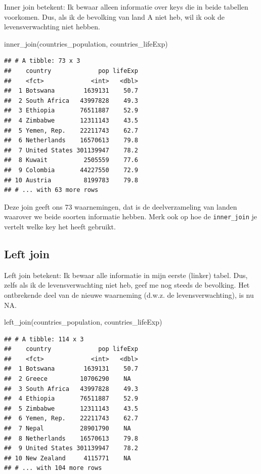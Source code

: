 \documentclass[]{tufte-book}
\newenvironment{Shaded}{}{}
\newcommand{\FunctionTok}[1]{\textcolor[rgb]{0.02,0.16,0.49}{#1}}
\newcommand{\NormalTok}[1]{#1}
\begin{document}
Inner join betekent: Ik bewaar alleen informatie over keys die in beide tabellen voorkomen. Dus, als ik de bevolking van land A niet heb, wil ik ook de levensverwachting niet hebben.

\begin{Shaded}
\begin{Highlighting}[]
\FunctionTok{inner\_join}\NormalTok{(countries\_population, countries\_lifeExp)}
\end{Highlighting}
\end{Shaded}

\begin{verbatim}
## # A tibble: 73 x 3
##    country             pop lifeExp
##    <fct>             <int>   <dbl>
##  1 Botswana        1639131    50.7
##  2 South Africa   43997828    49.3
##  3 Ethiopia       76511887    52.9
##  4 Zimbabwe       12311143    43.5
##  5 Yemen, Rep.    22211743    62.7
##  6 Netherlands    16570613    79.8
##  7 United States 301139947    78.2
##  8 Kuwait          2505559    77.6
##  9 Colombia       44227550    72.9
## 10 Austria         8199783    79.8
## # ... with 63 more rows
\end{verbatim}

Deze join geeft ons 73 waarnemingen, dat is de deelverzameling van landen waarover we beide soorten informatie hebben. Merk ook op hoe de \texttt{inner\_join} je vertelt welke key het heeft gebruikt.

\hypertarget{left-join}{%
\subsection{Left join}\label{left-join}}

Left join betekent: Ik bewaar alle informatie in mijn eerste (linker) tabel. Dus, zelfs als ik de levensverwachting niet heb, geef me nog steeds de bevolking. Het ontbrekende deel van de nieuwe waarneming (d.w.z. de levensverwachting), is nu NA.

\begin{Shaded}
\begin{Highlighting}[]
\FunctionTok{left\_join}\NormalTok{(countries\_population, countries\_lifeExp)}
\end{Highlighting}
\end{Shaded}

\begin{verbatim}
## # A tibble: 114 x 3
##    country             pop lifeExp
##    <fct>             <int>   <dbl>
##  1 Botswana        1639131    50.7
##  2 Greece         10706290    NA  
##  3 South Africa   43997828    49.3
##  4 Ethiopia       76511887    52.9
##  5 Zimbabwe       12311143    43.5
##  6 Yemen, Rep.    22211743    62.7
##  7 Nepal          28901790    NA  
##  8 Netherlands    16570613    79.8
##  9 United States 301139947    78.2
## 10 New Zealand     4115771    NA  
## # ... with 104 more rows
\end{verbatim}
\end{document}
